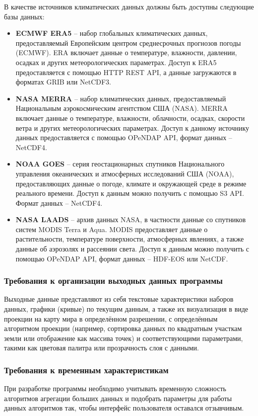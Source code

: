 \documentclass[a4paper, 12pt]{article}
\begin{document}
	В качестве источников климатических данных должны быть доступны следующие базы данных:
	\begin{itemize}
		\item \textbf{ECMWF ERA5} – набор глобальных климатических данных, предоставляемый Европейским центром среднесрочных
			прогнозов погоды (ECMWF). ERA включает данные о температуре, влажности, давлении, осадках и других метеорологических
			параметрах. Доступ к ERA5 предоставляется с помощью HTTP REST API, а данные загружаются в форматах GRIB или NetCDF3.

		\item \textbf{NASA MERRA} – набор климатических данных, предоставляемый Национальным аэрокосмическим агентством США (NASA).
			MERRA включает данные о температуре, влажности, облачности, осадках, скорости ветра и других метеорологических
			параметрах. Доступ к данному источнику данных предоставляется с помощью OPeNDAP API, формат данных – NetCDF4.

		\item \textbf{NOAA GOES} – серия геостационарных спутников Национального управления океанических и атмосферных
			исследований США (NOAA), предоставляющих данные о погоде, климате и окружающей среде в режиме реального времени. Доступ
			к данным можно получить с помощью S3 API. Формат данных – NetCDF4.

		\item \textbf{NASA LAADS} – архив данных NASA, в частности данные со спутников систем MODIS Terra и Aqua. MODIS
			предоставляет данные о растительности, температуре поверхности, атмосферных явлениях, а также данные об аэрозолях и
			рассеянии света. Доступ к данным можно получить с помощью OPeNDAP API, формат данных – HDF-EOS или NetCDF.
	\end{itemize}

	\subsubsection{Требования к организации выходных данных программы}\label{section:4.1.3}
	Выходные данные представляют из себя текстовые характеристики наборов данных, графики (кривые) по текущим данным, а также
	их визуализация в виде проекции на карту мира в определённом разрешении, с определённым алгоритмом проекции (например,
	сортировка данных по квадратным участкам земли или отображение как массива точек) и соответствующими параметрами,
	такими как цветовая палитра или прозрачность слоя с данными.

	\subsubsection{Требования к временным характеристикам}\label{section:4.1.4}
	При разработке программы необходимо учитывать временную сложность алгоритмов агрегации больших данных и подобрать
	параметры для работы данных алгоритмов так, чтобы интерфейс пользователя оставался отзывчивым.
\end{document}
